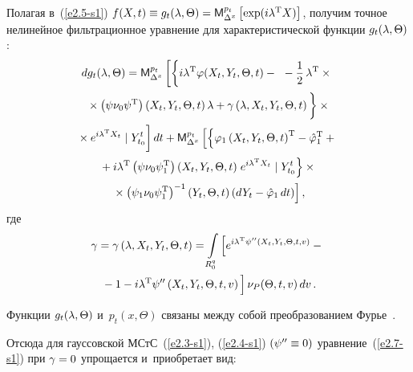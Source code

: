 \begin{multicols}{2}
Полагая в~(\ref{e2.5-s1}) $f(X,t) \hm\equiv g_t (\la,\Theta) \hm=
\mm_{\Delta^x}^{p_t}\lk\exp (i\la^{\mathrm{T}} X)\rk$, получим
точное нелинейное фильтрационное уравнение для  характеристической 
функции $g_t (\lambda,\Theta)$:
\begin{multline}
\!dg_t (\la,\Theta) = {\mm}_{\Delta^x}^{p_t} \left[ 
\left\{
\vphantom{\fr{1}{2}}
 i\la^{\mathrm{T}} \varphi (X_t,Y_t,\Theta, t) - {}\right.\right.
{}-\fr{1}{2}\, \la^{\mathrm{T}}\times{}\\[1pt]
\left.{}\times \left(\psi\nu_0\psi^{\mathrm{T}}\right) 
\left(X_t,Y_t,\Theta, t\right) \la+\gamma \left(\la, X_t, Y_t, \Theta, t\right) 
\vphantom{\fr{1}{2}}\right\}\times{}\\[1pt]
\!\left.{}\times e^{i\la^{\mathrm{T}} X_t} \mid Y_{t_0}^t 
\vphantom{\fr{1}{2}}
\right] dt+ 
{\mm}_{\Delta^x}^{p_t} \left[ 
\left\{ 
\varphi_1 \left(X_t,Y_t,\Theta, t\right)^{\mathrm{T}} -
\hat\varphi_1^{\mathrm{T}} +{}\right.\right.\hspace*{-0.70326pt}\\[1pt]
{}+
    i\la^{\mathrm{T}} \left(\psi\nu_0\psi_1^{\mathrm{T}}\right) 
    \left(X_t,Y_t, \Theta,t\right) \left.  
    e^{i\la^{\mathrm{T}} X_t} \mid Y_{t_0}^t \right\} \times{}\\[1pt]
    \left.{}\times
  \left(\psi_1\nu_0\psi_1^{\mathrm{T}}\right)^{-1} \left(Y_t,\Theta,t\right) 
  \left(dY_t-\hat\varphi_1 \,dt\right)\right], 
  \label{e2.9-s1}
  \end{multline}
где
\begin{multline}
\gamma=\gamma \left(\la, X_t, Y_t, \Theta, t\right)=
\int\limits_{R_0^q}\left[ e^{i\la^{\mathrm{T}} 
\psi''\left(X_t,Y_t,\Theta, t,v\right)} - 
 {}\right.\\
\left.{}-1- i\la^{\mathrm{T}} \psi''\left(X_t,Y_t,\Theta, t,v\right)
\vphantom{e^{i\la^{\mathrm{T}}}}
\right] 
\nu_P (\Theta, t,v) \,dv\,.\label{e2.10-s1}
\end{multline}

Функции $g_t (\lambda,\Theta)$ и~$p_t(x,\Theta)$ связаны между собой преобразованием 
Фурье~\cite{8-s1}.

Отсюда для гауссовской МСтС~(\ref{e2.3-s1}), (\ref{e2.4-s1}) $(\psi''\hm\equiv 0)$ 
уравнение~(\ref{e2.7-s1}) при  $\gamma\hm=0$ упрощается и~приобретает вид:


\end{multicols}
